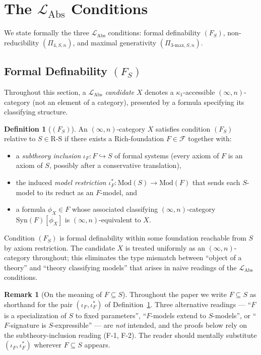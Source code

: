 \documentclass[11pt]{article}
\theoremstyle{plain}
\theoremstyle{definition}
\newtheorem{definition}[theorem]{Definition}
\newtheorem{remark}[theorem]{Remark}
\newcommand{\RS}{\mathrm{R\text{-}S}}
\newcommand{\cF}{\mathcal{F}}
\newcommand{\LAbs}{\mathcal{L}_{\mathrm{Abs}}}
\newcommand{\Syn}{\mathrm{Syn}}
\newcommand{\Mod}{\mathrm{Mod}}
\begin{document}
\section{\texorpdfstring{The $\LAbs$ Conditions}{The L\_Abs Conditions}}\label{sec:conditions}

We state formally the three $\LAbs$ conditions: formal definability $(F_S)$, non-reducibility $(\Pi_{4, S, n})$, and maximal generativity $(\Pi_{3\text{-max}, S, n})$.

\subsection{\texorpdfstring{Formal Definability $(F_S)$}{Formal Definability (F\_S)}}

Throughout this section, a \emph{$\LAbs$ candidate} $X$ denotes a $\kappa_1$-accessible $(\infty, n)$-category (not an element of a category), presented by a formula specifying its classifying structure.

\begin{definition}[$(F_S)$]\label{def:F}
An $(\infty, n)$-category $X$ satisfies condition $(F_S)$ relative to $S \in \RS$ if there exists a Rich-foundation $F \in \cF$ together with:
\begin{itemize}
\item[\textbf{(F-1)}] a \emph{subtheory inclusion} $\iota_F : F \hookrightarrow S$ of formal systems (every axiom of $F$ is an axiom of $S$, possibly after a conservative translation),
\item[\textbf{(F-2)}] the induced \emph{model restriction} $\iota_F^* : \Mod(S) \to \Mod(F)$ that sends each $S$-model to its reduct as an $F$-model, and
\item[\textbf{(F-3)}] a formula $\phi_X \in F$ whose associated classifying $(\infty, n)$-category $\Syn(F)[\phi_X]$ is $(\infty, n)$-equivalent to $X$.
\end{itemize}
\end{definition}

Condition $(F_S)$ is formal definability within some foundation reachable from $S$ by axiom restriction. The candidate $X$ is treated uniformly as an $(\infty, n)$-category throughout; this eliminates the type mismatch between ``object of a theory'' and ``theory classifying models'' that arises in naive readings of the $\LAbs$ conditions.

\begin{remark}[On the meaning of $F \subseteq S$]\label{rem:F-subset-S}
Throughout the paper we write $F \subseteq S$ as shorthand for the pair $(\iota_F, \iota_F^*)$ of Definition~\ref{def:F}. Three alternative readings --- ``$F$ is a specialization of $S$ to fixed parameters'', ``$F$-models extend to $S$-models'', or ``$F$-signature is $S$-expressible'' --- are \emph{not} intended, and the proofs below rely on the subtheory-inclusion reading (F-1, F-2). The reader should mentally substitute $(\iota_F, \iota_F^*)$ wherever $F \subseteq S$ appears.
\end{remark}
\end{document}
